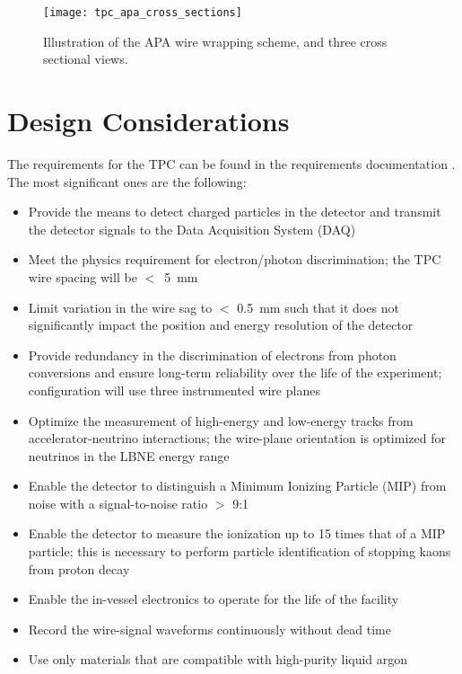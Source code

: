 \begin{figure}[htpb]
\centering
\texttt{[image: tpc\_apa\_cross\_sections]}
\caption[Illustration of the APA wire wrapping scheme]{Illustration of the APA wire wrapping scheme, and three cross sectional views. } 
\label{fig:tpc-wire-frame-xsect}
\end{figure}

\section{Design Considerations} 
\label{sec:v5-tpc-reqs-n-specs}

The requirements for the TPC can be found in the requirements documentation \cite{lar-fd-req}. The most significant ones are the following:

\begin{itemize}	
\item Provide the means to detect charged particles in the detector and transmit the detector signals to the Data Acquisition System (DAQ)
\item Meet the physics requirement for electron/photon discrimination;  the TPC wire spacing will be $<$~5~mm
\item Limit variation in the wire sag to $<$ 0.5~mm such that it does not significantly impact the position and energy resolution of the detector
\item Provide redundancy in the discrimination of electrons from photon conversions and ensure long-term reliability over the life of the experiment;  configuration will use three instrumented wire planes
\item Optimize the measurement of high-energy and low-energy tracks from accelerator-neutrino interactions; the wire-plane orientation is optimized for neutrinos in the LBNE energy range
\item Enable the detector to distinguish a Minimum Ionizing Particle (MIP) from noise with a signal-to-noise ratio $>$ 9:1
\item Enable the detector to measure the ionization up to 15 times that of a MIP particle; this is necessary to perform particle identification of stopping kaons from proton decay
\item Enable the in-vessel electronics to operate for the life of the facility
\item Record the wire-signal waveforms continuously without dead time
\item Use only materials that are compatible with high-purity liquid argon

\end{itemize}

